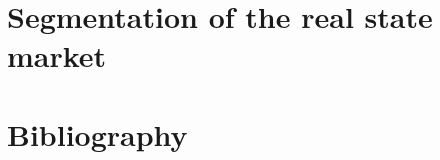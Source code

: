 \documentclass[
	11pt, %
	fleqn, %
	b5paper,
]{LegrandOrangeBook}
\begin{document}
\chapter{Segmentation of the real state market}


\stopcontents[part] %


\chapterimage{} %
\chapterspaceabove{2.5cm} %
\chapterspacebelow{2cm} %


\chapter*{Bibliography}
\printbibliography






\end{document}
